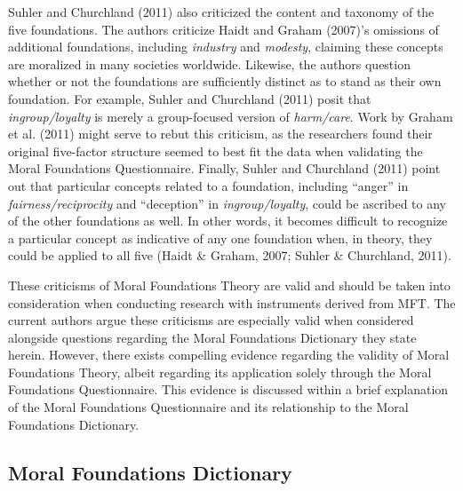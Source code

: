 \documentclass[english,,man]{apa6}
\begin{document}
Suhler and Churchland (2011) also criticized the content and taxonomy of
the five foundations. The authors criticize Haidt and Graham (2007)'s
omissions of additional foundations, including \emph{industry} and
\emph{modesty}, claiming these concepts are moralized in many societies
worldwide. Likewise, the authors question whether or not the foundations
are sufficiently distinct as to stand as their own foundation. For
example, Suhler and Churchland (2011) posit that \emph{ingroup/loyalty}
is merely a group-focused version of \emph{harm/care}. Work by Graham et
al. (2011) might serve to rebut this criticism, as the researchers found
their original five-factor structure seemed to best fit the data when
validating the Moral Foundations Questionnaire. Finally, Suhler and
Churchland (2011) point out that particular concepts related to a
foundation, including \enquote{anger} in \emph{fairness/reciprocity} and
\enquote{deception} in \emph{ingroup/loyalty}, could be ascribed to any
of the other foundations as well. In other words, it becomes difficult
to recognize a particular concept as indicative of any one foundation
when, in theory, they could be applied to all five (Haidt \& Graham,
2007; Suhler \& Churchland, 2011).

These criticisms of Moral Foundations Theory are valid and should be
taken into consideration when conducting research with instruments
derived from MFT. The current authors argue these criticisms are
especially valid when considered alongside questions regarding the Moral
Foundations Dictionary they state herein. However, there exists
compelling evidence regarding the validity of Moral Foundations Theory,
albeit regarding its application solely through the Moral Foundations
Questionnaire. This evidence is discussed within a brief explanation of
the Moral Foundations Questionnaire and its relationship to the Moral
Foundations Dictionary.

\subsection{Moral Foundations
Dictionary}\label{moral-foundations-dictionary}
\end{document}
